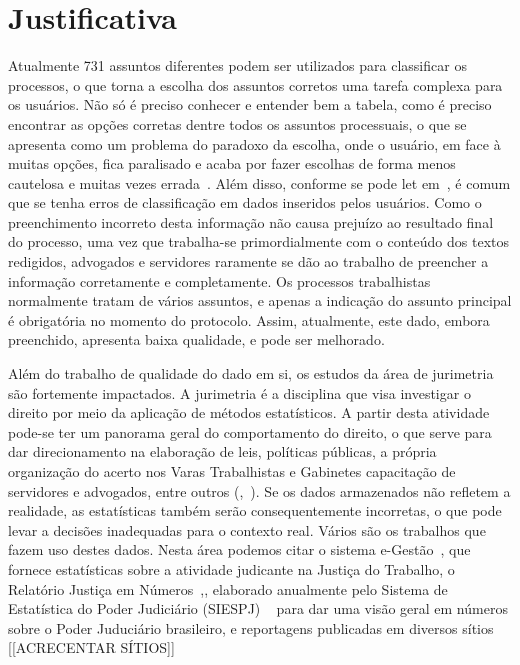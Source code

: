 \section{Justificativa}%
Atualmente 731 assuntos diferentes podem ser utilizados para classificar os processos, o que torna a escolha dos assuntos corretos uma tarefa complexa para os usuários. Não só é preciso conhecer e entender bem a tabela, como é preciso encontrar as opções corretas dentre todos os assuntos processuais, o que se apresenta como um problema do paradoxo da escolha, onde o usuário, em face à muitas opções, fica paralisado e acaba por fazer escolhas de forma menos cautelosa e muitas vezes errada~\cite{paradoxofchoice}. Além  disso, conforme se pode let em~\cite{mislabeled_survey}, é comum que se tenha erros de classificação em dados inseridos pelos usuários. Como o preenchimento incorreto desta informação não causa prejuízo ao resultado final do processo, uma vez que trabalha-se primordialmente com o conteúdo dos textos redigidos, advogados e servidores raramente se dão ao trabalho de preencher a informação corretamente e completamente. Os processos trabalhistas normalmente tratam de vários assuntos, e apenas a indicação do assunto principal é obrigatória no momento do protocolo. Assim, atualmente, este dado, embora preenchido, apresenta baixa qualidade, e pode ser melhorado.


Além do trabalho de qualidade do dado em si, os estudos da área de jurimetria são fortemente impactados. A jurimetria é a disciplina que visa investigar o direito por meio da aplicação de métodos estatísticos. A partir desta atividade pode-se ter um panorama geral do comportamento do direito, o que serve para dar direcionamento na elaboração de leis, políticas públicas, a própria organização do acerto nos Varas Trabalhistas e Gabinetes capacitação de servidores e advogados, entre outros (\cite{jurimetriaingles},~\cite{jurimetriaportugues}). Se os dados armazenados não refletem a realidade, as estatísticas também serão consequentemente incorretas, o que pode levar a decisões inadequadas para o contexto real. Vários são os trabalhos que fazem uso destes dados. Nesta área podemos citar o sistema e-Gestão~\cite{leiegestao}, que fornece estatísticas sobre a atividade judicante na Justiça do Trabalho,  o Relatório Justiça em Números~\cite{leijusticaemnumeros},\cite{leijusticaemnumeros}, elaborado anualmente pelo Sistema de Estatística do Poder Judiciário (SIESPJ) ~\cite{leisiespj} para dar uma visão geral em números sobre o Poder Juduciário brasileiro, e reportagens publicadas em diversos sítios [[ACRECENTAR SÍTIOS]]

